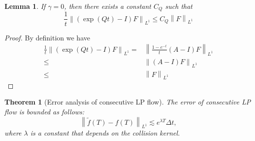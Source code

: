 \documentclass{article}
\newtheorem{theorem}{Theorem}
\newtheorem{lemma}{Lemma}
\numberwithin{equation}{section}
\begin{document}
\begin{lemma}
    If $\gamma = 0$, then there exists a constant $C_{Q}$ such that
    \begin{equation*}
        \frac{1}{t}\left\lVert\left(\exp{(Qt)}- I\right)F\right\rVert_{L^{1}} \leq C_{Q}\left\lVert F\right\rVert_{L^{1}}
    \end{equation*}
\end{lemma}
\begin{proof}
    By definition we have
    \begin{equation*}
        \begin{split}
            \frac{1}{t}\left\lVert\left(\exp{(Qt)}- I\right)F\right\rVert_{L^{1}}  =&\left\lVert \frac{1-e^{-t}}{t}(A-I)F\right\rVert_{L^{1}} \\
            \leq & \left\lVert (A-I)F\right\rVert_{L^{1}}\\
            \leq & \left\lVert F\right\rVert_{L^{1}}
        \end{split}
    \end{equation*}
\end{proof}
\begin{theorem}[Error analysis of consecutive LP flow]
    The error of consecutive LP flow is bounded as follows:
    \begin{equation*}
        \left\lVert \widetilde{f}(T)- f(T)\right\rVert_{L^{1}} \lesssim 
        e^{\lambda T}\Delta t,
    \end{equation*}
    where $\lambda$ is a constant that depends on the collision kernel.
\end{theorem}
\end{document}
